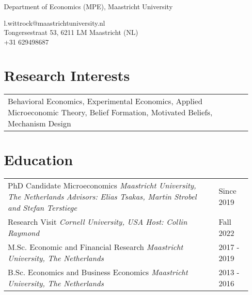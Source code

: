 \documentclass[11pt]{article}
\begin{document}
 

\pagestyle{empty} 

\par{\par}  
\parskip 12pt

\begin{center}
		Department of Economics (MPE), Maastricht University 	\\
		\rule{0pt}{4ex} \faSendO{} l.wittrock@maastrichtuniversity.nl \\
 								\Letter{} Tongersestraat 53, 6211 LM Maastricht (NL) \\
 								\faPhone{} +31 629498687
 \end{center}
	
\vspace*{1em}

\section{Research Interests}

\noindent\begin{tabular}{L{16cm}}
 Behavioral Economics, Experimental Economics, Applied Microeconomic Theory, Belief Formation, Motivated Beliefs, Mechanism Design
\end{tabular}


\section{Education}
\noindent\begin{tabular}{L{14cm}L{3cm}}
PhD Candidate Microeconomics \newline \textit{Maastricht University, The Netherlands}	\newline \textit{Advisors: Elias Tsakas, Martin Strobel and Stefan Terstiege} & Since 2019   \\
\rule{0pt}{4ex}Research Visit  \newline \textit{Cornell University, USA} \newline \textit{Host: Collin Raymond} & Fall 2022  \\
\rule{0pt}{4ex}M.Sc. Economic and Financial Research  \newline \textit{Maastricht University, The Netherlands}  & 2017 - 2019  \\
\rule{0pt}{4ex}B.Sc. Economics and Business Economics  \newline \textit{Maastricht University, The Netherlands} 	& 2013 - 2016 	
\end{tabular}
\end{document}
